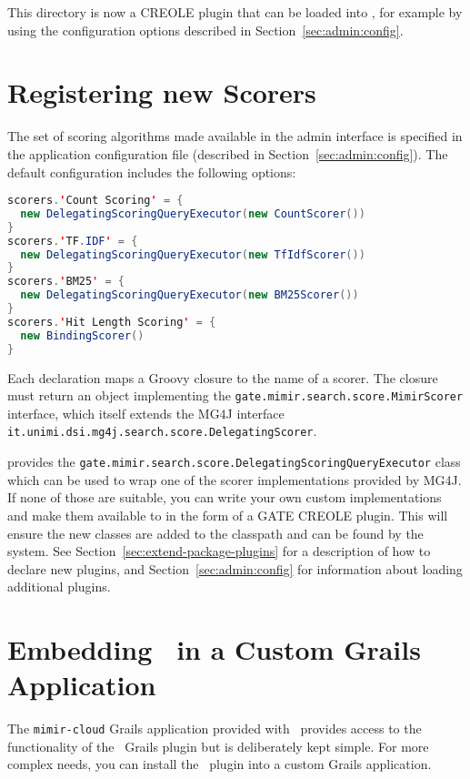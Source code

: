 This directory is now a CREOLE plugin that can be loaded into \Mimir, for
example by using the configuration options described in
Section~\ref{sec:admin:config}.
\section{Registering new Scorers}
\label{sec:extend:scorers}

The set of scoring algorithms made available in the admin interface is specified
in the application configuration file (described in
Section~\ref{sec:admin:config}). The default configuration includes the
following options:
\begin{lstlisting}[language=Java]
scorers.'Count Scoring' = {
  new DelegatingScoringQueryExecutor(new CountScorer())
}
scorers.'TF.IDF' = {
  new DelegatingScoringQueryExecutor(new TfIdfScorer())
}
scorers.'BM25' = {
  new DelegatingScoringQueryExecutor(new BM25Scorer())
}
scorers.'Hit Length Scoring' = {
  new BindingScorer()
}
\end{lstlisting}

Each declaration maps a Groovy closure to the name of a scorer. The closure must
return an object implementing the
\lstinline!gate.mimir.search.score.MimirScorer! interface, which itself extends
the MG4J interface \lstinline!it.unimi.dsi.mg4j.search.score.DelegatingScorer!.

\Mimir{} provides the
\lstinline!gate.mimir.search.score.DelegatingScoringQueryExecutor! class which
can be used to wrap one of the scorer implementations provided by MG4J. If none
of those are suitable, you can write your own custom implementations and make
them available to \Mimir{} in the form of a GATE CREOLE plugin. This will ensure
the new classes are added to the classpath and can be found by the system. See
Section~\ref{sec:extend-package-plugins} for a description of how to declare new
plugins, and Section~\ref{sec:admin:config} for information about loading
additional plugins.
 

\section{Embedding \Mimir\ in a Custom Grails Application}
\label{sec:extend:customapp}

The {\tt mimir-cloud} Grails application provided with \Mimir\ provides access
to the functionality of the \Mimir\ Grails plugin but is deliberately kept
simple. For more complex needs, you can install the \Mimir\ plugin into a custom
Grails application.

